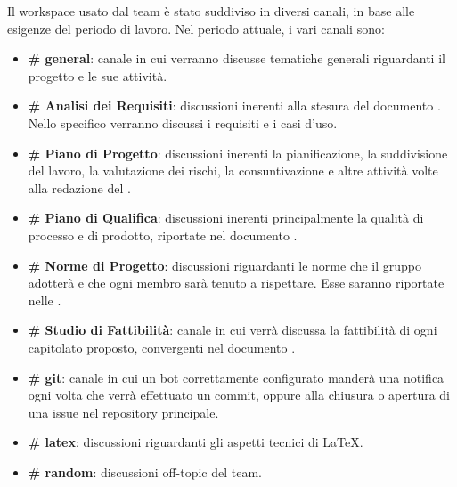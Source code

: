 			Il workspace usato dal team è stato suddiviso in diversi canali, in base alle esigenze del periodo di lavoro. Nel periodo attuale, i vari canali sono:
			\begin{itemize}
				\item \textbf{\# general}: canale in cui verranno discusse tematiche generali riguardanti il progetto e le sue attività.
				\item \textbf{\# Analisi dei Requisiti}: discussioni inerenti alla stesura del documento \Doc{\AdR}. Nello specifico verranno discussi
					 i requisiti e i casi d'uso.
				\item \textbf{\# Piano di Progetto}: discussioni inerenti la pianificazione, la suddivisione del lavoro, la valutazione dei rischi, la consuntivazione e
					altre attività volte alla redazione del \Doc{\PdP}.
				\item \textbf{\# Piano di Qualifica}: discussioni inerenti principalmente la qualità di processo e di prodotto, riportate nel documento \Doc{\PdQ}.
				\item \textbf{\# Norme di Progetto}: discussioni riguardanti le norme che il gruppo adotterà e che ogni membro sarà tenuto a rispettare. Esse
					saranno riportate nelle \Doc{\NdP}.
				\item \textbf{\# Studio di Fattibilità}: canale in cui verrà discussa la fattibilità di ogni capitolato proposto, convergenti nel documento
					\Doc{\SdF}.
				\item \textbf{\# git}: canale in cui un bot correttamente configurato manderà una notifica ogni volta che verrà effettuato un commit, oppure alla chiusura o apertura di una issue nel repository principale.
				\item \textbf{\# latex}: discussioni riguardanti gli aspetti tecnici di \LaTeX.
				\item \textbf{\# random}: discussioni off-topic del team.
			\end{itemize}

